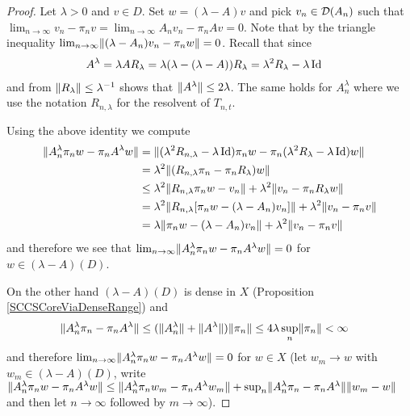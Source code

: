 \begin{proof}
Let $\lambda > 0$ and $v \in D$.  Set $w = (\lambda - A) v$ and pick $v_n \in \mathcal{D}(A_n)$ such that $\lim_{n \to \infty} {v_n - \pi_n v} = \lim_{n \to \infty} {A_nv_n - \pi_n Av} = 0$.  Note that by the triangle inequality $\lim_{n \to \infty} \lVert (\lambda - A_n) v_n - \pi_n w \rVert = 0$.  Recall that since 
\begin{align*}
A^\lambda &= \lambda A R_\lambda = \lambda (\lambda - (\lambda - A)) R_\lambda = \lambda^2 R_\lambda - \lambda \operatorname*{Id}
\end{align*}
and from $\lVert R_\lambda \rVert \leq \lambda^{-1}$ shows that $\lVert A^\lambda \rVert \leq 2 \lambda$.  The same holds for $A^\lambda_n$ where we use the notation $R_{n, \lambda}$ for the resolvent of $T_{n,t}$.

Using the above identity we compute
\begin{align*}
\lVert A^\lambda_n \pi_n w  - \pi_n A^\lambda w \rVert 
&= \lVert (\lambda^2 R_{n,\lambda} - \lambda \operatorname*{Id}) \pi_n w  - \pi_n (\lambda^2 R_{\lambda} - \lambda \operatorname*{Id})  w \rVert \\
&=\lambda^2 \lVert (R_{n,\lambda} \pi_n - \pi_n R_{\lambda}) w \rVert  \\
&\leq \lambda^2 \lVert R_{n,\lambda} \pi_n w - v_n \rVert  + \lambda^2 \lVert v_n - \pi_n R_{\lambda} w \rVert  \\
&= \lambda^2 \lVert R_{n,\lambda} [\pi_n w - (\lambda - A_n) v_n] \rVert  + \lambda^2 \lVert v_n - \pi_n v \rVert  \\
&= \lambda \lVert \pi_n w - (\lambda - A_n) v_n \rVert  + \lambda^2 \lVert v_n - \pi_n v \rVert  \\
\end{align*}
and therefore we see that $\lim_{n \to \infty} \lVert A^\lambda_n \pi_n w  - \pi_n A^\lambda w \rVert = 0$ for $w \in (\lambda -A)(D)$.

On the other hand $(\lambda - A)(D)$ is dense in $X$ (Proposition \ref{SCCSCoreViaDenseRange}) and 
\begin{align*}
\lVert A^\lambda_n \pi_n - \pi_n A^\lambda \rVert &\leq (\lVert A^\lambda_n \rVert + \lVert A^\lambda \rVert) \lVert \pi_n \rVert \leq 4 \lambda \sup_{n} \lVert \pi_n \rVert < \infty
\end{align*}
and therefore $\lim_{n \to \infty} \lVert A^\lambda_n \pi_n w  - \pi_n A^\lambda w \rVert = 0$ for $w \in X$ (let $w_m \to w$ with $w_m \in  (\lambda -A)(D)$, write
$\lVert A^\lambda_n \pi_n w  - \pi_n A^\lambda w \rVert \leq \lVert A^\lambda_n \pi_n w_m  - \pi_n A^\lambda w_m \rVert + \sup_n \lVert A^\lambda_n \pi_n - \pi_n A^\lambda \rVert \lVert w_m -w \rVert$
and then let $n \to \infty$ followed by $m \to \infty$).
\end{proof}

